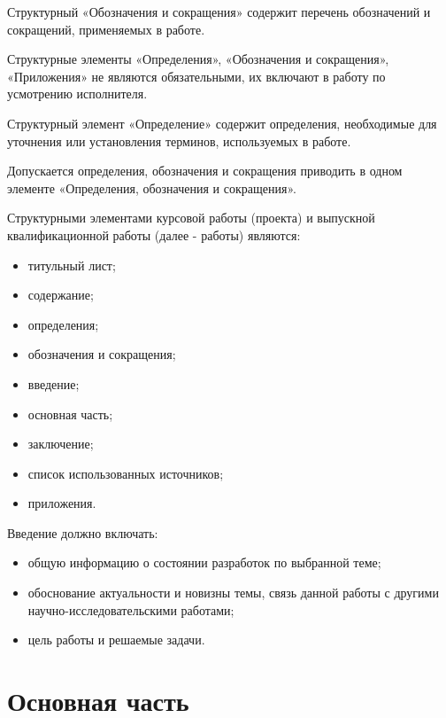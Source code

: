 \documentclass[14pt]{extreport}
\begin{document}
\pagestyle{empty} %


\pagestyle{plain} %
\tableofcontents

\abbreviations
Структурный  «Обозначения и сокращения» содержит перечень обозначений и сокращений, применяемых в работе. 

Структурные элементы «Определения», «Обозначения и сокращения», «Приложения»
не являются обязательными, их включают в работу по усмотрению исполнителя. 

Структурный элемент «Определение» содержит определения, необходимые для уточнения или установления терминов, используемых в работе.

\abbrevdef
Допускается определения, обозначения и сокращения приводить в одном элементе
«Определения, обозначения и сокращения».

\intro

Структурными элементами курсовой работы (проекта) и выпускной квалификационной работы (далее - работы) являются:
\begin{itemize}
\item титульный лист;
\item содержание;
\item определения;
\item обозначения и сокращения;
\item введение;
\item основная часть;
\item заключение;
\item список использованных источников;
\item приложения.
\end{itemize}

Введение должно включать:
\begin{itemize}
\item общую информацию о состоянии разработок по выбранной теме;  
\item обоснование актуальности и новизны темы, связь данной работы с другими научно-исследовательскими работами;
\item цель работы и решаемые задачи. 
\end{itemize}

\chapter{Основная часть\label{chapter2}}
\end{document}
